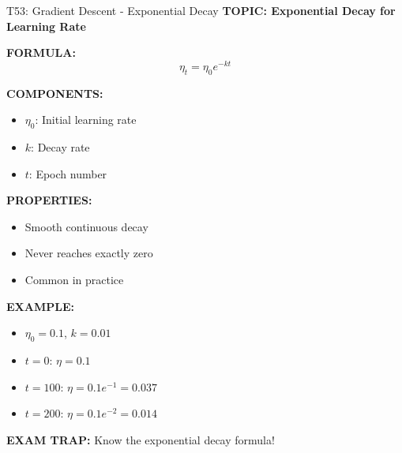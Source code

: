 \documentclass[8pt]{beamer}
\begin{document}
	\begin{frame}{T53: Gradient Descent - Exponential Decay}
		\fontsize{6.5}{7.5}\selectfont
		\textbf{TOPIC: Exponential Decay for Learning Rate}
		
		\vspace{0.1cm}
		\textbf{FORMULA:}
		\[
		\eta_t = \eta_0 e^{-kt}
		\]
		
		\vspace{0.1cm}
		\textbf{COMPONENTS:}
		\begin{itemize}
			\item $\eta_0$: Initial learning rate
			\item $k$: Decay rate
			\item $t$: Epoch number
		\end{itemize}
		
		\vspace{0.1cm}
		\textbf{PROPERTIES:}
		\begin{itemize}
			\item Smooth continuous decay
			\item Never reaches exactly zero
			\item Common in practice
		\end{itemize}
		
		\vspace{0.1cm}
		\textbf{EXAMPLE:}
		\begin{itemize}
			\item $\eta_0 = 0.1$, $k = 0.01$
			\item $t = 0$: $\eta = 0.1$
			\item $t = 100$: $\eta = 0.1 e^{-1} = 0.037$
			\item $t = 200$: $\eta = 0.1 e^{-2} = 0.014$
		\end{itemize}
		
		\textcolor{myred}{\textbf{EXAM TRAP:}} Know the \textcolor{myblue}{exponential decay formula}!
	\end{frame}
	
\end{document}
